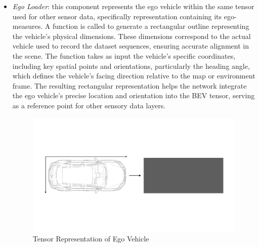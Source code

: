 \begin{itemize}
    \item \textit{Ego Loader}: this component represents the ego vehicle within the same tensor used for other sensor data, specifically representation containing its ego-measures. A function is called to generate a rectangular outline representing the vehicle's physical dimensions. These dimensions correspond to the actual vehicle used to record the dataset sequences, ensuring accurate alignment in the scene. 
    The function takes as input the vehicle's specific coordinates, including key spatial points and orientations, particularly the heading angle, which defines the vehicle's facing direction relative to the map or environment frame. The resulting rectangular representation helps the network integrate the ego vehicle's precise location and orientation into the BEV tensor, serving as a reference point for other sensory data layers.
    \begin{figure}[H]
        \centering
        \includegraphics[width=0.75\linewidth]{LateX//figs/egoLoader.pdf}
        \caption{Tensor Representation of Ego Vehicle}
        \label{fig:ego-loader}
    \end{figure}


\end{itemize}
